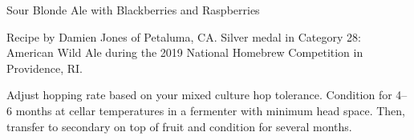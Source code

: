 \stylesection{\stylefruitbeer}

\begin{recipe}{Sour Blonde Ale with Blackberries and Raspberries} %

\begin{aboutblock}
Recipe by Damien Jones of Petaluma, CA. Silver medal in Category 28: American
Wild Ale during the 2019 National Homebrew Competition in Providence, RI.
\sourceaha
\end{aboutblock}


\begin{methodandtiming}
 
\begin{mashsteps}
\end{mashsteps}

\begin{fermentationsteps}
\end{fermentationsteps}

\begin{directions}
Adjust hopping rate based on your mixed culture hop tolerance.
Condition for 4--6 months at cellar temperatures in a fermenter with
minimum head space. Then, transfer to secondary on top of fruit
and condition for several months.
\end{directions}

\end{methodandtiming}

\recipebreak

\begin{ingredientsblock}

\begin{malts}
\end{malts}

\begin{hops}
\end{hops}


\begin{twists}
\end{twists}

\end{ingredientsblock}

\end{recipe}
